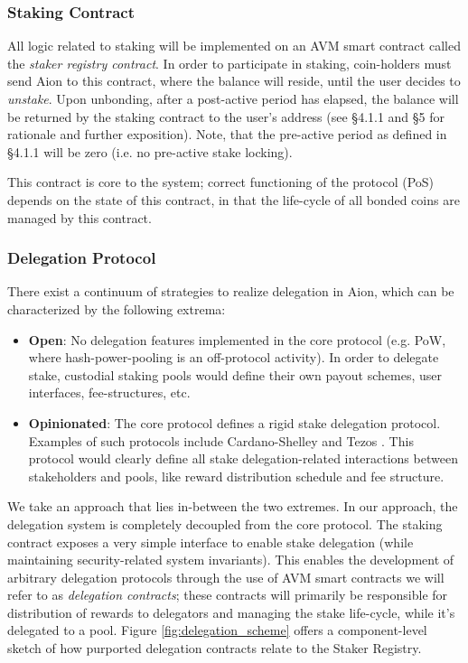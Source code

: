\subsubsection{Staking Contract}
All logic related to staking will be implemented on an AVM smart contract called the \textit{staker registry contract}. In order to participate in staking, coin-holders must send Aion to this contract, where the balance will reside, until the user decides to \textit{unstake}. Upon unbonding, after a post-active period has elapsed, the balance will be returned by the staking contract to the user's address (see \cite{WZS19} \S4.1.1 and \S5 for rationale and further exposition). Note, that the pre-active period as defined in \cite{WZS19} \S4.1.1 will be zero (i.e. no pre-active stake locking).  

This contract is core to the system; correct functioning of the protocol (PoS) depends on the state of this contract, in that the life-cycle of all bonded coins are managed by this contract. 

\subsubsection{Delegation Protocol}
There exist a continuum of strategies to realize delegation in Aion, which can be characterized by the following extrema:
\begin{itemize}
    \item \textbf{Open}: No delegation features implemented in the core protocol (e.g. PoW, where hash-power-pooling is an off-protocol activity). In order to delegate stake, custodial staking pools would define their own payout schemes, user interfaces, fee-structures, etc. 
    \item \textbf{Opinionated}: The core protocol defines a rigid stake delegation protocol. Examples of such protocols include Cardano-Shelley \cite{KBC19} and Tezos \cite{Goo14}. This protocol would clearly define all stake delegation-related interactions between stakeholders and pools, like reward distribution schedule and fee structure.   
\end{itemize}

We take an approach that lies in-between the two extremes. In our approach, the delegation system is completely decoupled from the core protocol. The staking contract exposes a very simple interface to enable stake delegation (while maintaining security-related system invariants). This enables the development of arbitrary delegation protocols through the use of AVM smart contracts we will refer to as \textit{delegation contracts}; these contracts will primarily be responsible for distribution of rewards to delegators and managing the stake life-cycle, while it's delegated to a pool. Figure \ref{fig:delegation_scheme} offers a component-level sketch of how purported delegation contracts relate to the Staker Registry. 

